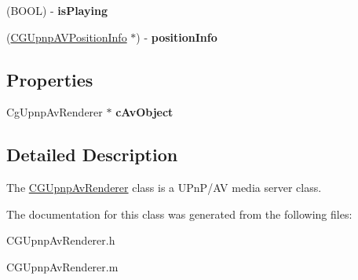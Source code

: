 \begin{DoxyCompactItemize}
\item 
\hypertarget{interface_c_g_upnp_av_renderer_a8356dd261f9edce33e4356b5da92b386}{(B\-O\-O\-L) -\/ {\bfseries is\-Playing}}\label{interface_c_g_upnp_av_renderer_a8356dd261f9edce33e4356b5da92b386}

\item 
\hypertarget{interface_c_g_upnp_av_renderer_adb2363c3779829a63fc39f4fef7a776f}{(\hyperlink{interface_c_g_upnp_a_v_position_info}{C\-G\-Upnp\-A\-V\-Position\-Info} $\ast$) -\/ {\bfseries position\-Info}}\label{interface_c_g_upnp_av_renderer_adb2363c3779829a63fc39f4fef7a776f}

\end{DoxyCompactItemize}
\subsection*{Properties}
\begin{DoxyCompactItemize}
\item 
\hypertarget{interface_c_g_upnp_av_renderer_a9dae4d063066230085426dee4daf3ef1}{Cg\-Upnp\-Av\-Renderer $\ast$ {\bfseries c\-Av\-Object}}\label{interface_c_g_upnp_av_renderer_a9dae4d063066230085426dee4daf3ef1}

\end{DoxyCompactItemize}


\subsection{Detailed Description}
The \hyperlink{interface_c_g_upnp_av_renderer}{C\-G\-Upnp\-Av\-Renderer} class is a U\-Pn\-P/\-A\-V media server class. 

The documentation for this class was generated from the following files\-:\begin{DoxyCompactItemize}
\item 
C\-G\-Upnp\-Av\-Renderer.\-h\item 
C\-G\-Upnp\-Av\-Renderer.\-m\end{DoxyCompactItemize}
